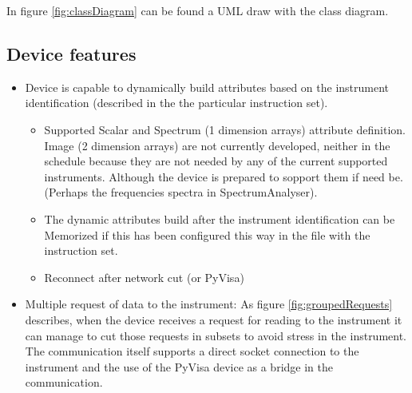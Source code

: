 \documentclass[a4paper,10pt]{article}
\begin{document}
In figure \ref{fig:classDiagram} can be found a UML draw with the class diagram.

\begin{figure}[h!]
\end{figure}

\subsection{Device features}

\begin{itemize}
    \item Device is capable to dynamically build attributes based on the instrument identification (described in the the particular instruction set).
    \begin{itemize}
        \item Supported Scalar and Spectrum (1 dimension arrays) attribute definition. Image (2 dimension arrays) are not currently developed, neither in the schedule because they are not needed by any of the current supported instruments. Although the device is prepared to sopport them if need be. (Perhaps the frequencies spectra in SpectrumAnalyser).
        \item The dynamic attributes build after the instrument identification can be Memorized if this has been configured this way in the file with the instruction set.
        \item Reconnect after network cut (or PyVisa)
    \end{itemize}
    \item Multiple request of data to the instrument: As figure \ref{fig:groupedRequests} describes, when the device receives a request for reading to the instrument it can manage to cut those requests in subsets to avoid stress in the instrument. The communication itself supports a direct socket connection to the instrument and the use of the PyVisa device as a bridge in the communication.
\end{itemize}
\end{document}
